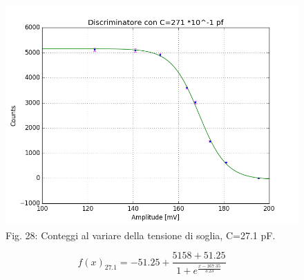 \documentclass[a4paper]{article}
\begin{document}
\begin{figure}[H]
\includegraphics[width=1\textwidth]{discriminatore_271C}
        \caption{Fig. 28: Conteggi al variare della tensione di soglia, C=27.1 pF.}
        \label{fig:28}
\end{figure}
\begin{equation}
f(x)_{27.1}= -51.25 + \frac{5158+51.25}{1+e^{\frac{x-167.35}{3.23}}}
\end{equation}
\newpage
\end{document}
